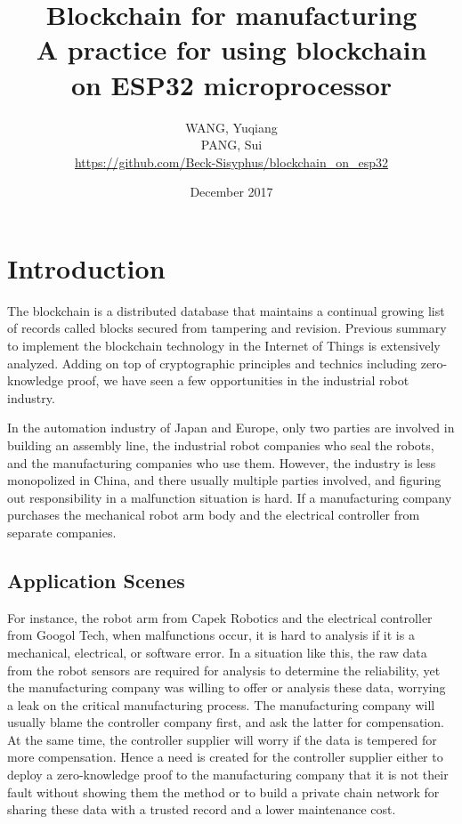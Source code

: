 \documentclass{article}
\title{Blockchain for manufacturing \\
 A practice for using blockchain \\
 on ESP32 microprocessor}
\author{WANG, Yuqiang \\ PANG, Sui \\ \url{https://github.com/Beck-Sisyphus/blockchain_on_esp32}}
\date{December 2017}
\begin{document}
\maketitle

\section{Introduction}

    The blockchain is a distributed database that maintains a continual growing list of records called blocks secured from tampering and revision.\citep{narayanan2016bitcoin} Previous summary to implement the blockchain technology in the Internet of Things is extensively analyzed.\citep{christidis2016blockchains} Adding on top of cryptographic principles and technics including zero-knowledge proof, we have seen a few opportunities in the industrial robot industry.

    In the automation industry of Japan and Europe, only two parties are involved in building an assembly line, the industrial robot companies who seal the robots, and the manufacturing companies who use them. However, the industry is less monopolized in China, and there usually multiple parties involved, and figuring out responsibility in a malfunction situation is hard. If a manufacturing company purchases the mechanical robot arm body and the electrical controller from separate companies.

    \subsection{Application Scenes}
    For instance, the robot arm from Capek Robotics and the electrical controller from Googol Tech, when malfunctions occur, it is hard to analysis if it is a mechanical, electrical, or software error. In a situation like this, the raw data from the robot sensors are required for analysis to determine the reliability, yet the manufacturing company was willing to offer or analysis these data, worrying a leak on the critical manufacturing process. The manufacturing company will usually blame the controller company first, and ask the latter for compensation. At the same time, the controller supplier will worry if the data is tempered for more compensation. Hence a need is created for the controller supplier either to deploy a zero-knowledge proof to the manufacturing company that it is not their fault without showing them the method or to build a private chain network for sharing these data with a trusted record and a lower maintenance cost.
\end{document}
